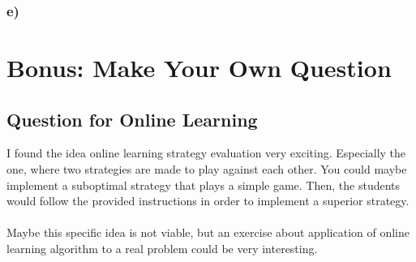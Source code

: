 \documentclass[a4paper]{article}
\begin{document}
\subsubsection*{e)}

\section{Bonus: Make Your Own Question}
\label{sec:3}
\subsection{Question for Online Learning}
I found the idea online learning strategy evaluation very exciting.
Especially the one, where two strategies are made to play against each other.
You could maybe implement a suboptimal strategy that plays a
simple game. Then, the students would follow the provided instructions in order
to implement a superior strategy. \\\\
Maybe this specific idea is not viable, but an exercise about application of
online learning algorithm to a real problem could be very interesting.
\end{document}
